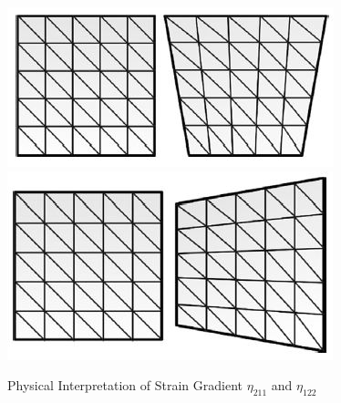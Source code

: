 \documentclass[12pt]{article}
\begin{document}
\begin{figure}[H]
	\begin{center}
		\includegraphics[scale=0.8]{U121_Eta_121.JPG}  \qquad \qquad
		\includegraphics[scale=0.8]{U212_Eta_212.JPG}
   	\caption{Physical Interpretation of Strain Gradient $\eta_{211}$ and $\eta_{122}$}
	\end{center}  
\end{figure}
\end{document}
